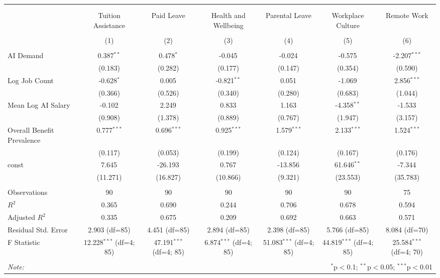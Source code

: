 \begin{table}[!htbp] \centering
\begin{tabular}{@{\extracolsep{5pt}}lcccccc}
\\[-1.8ex]\hline
\hline \\[-1.8ex]
\\[-1.8ex] & \multicolumn{1}{c}{Tuition Assistance} & \multicolumn{1}{c}{Paid Leave} & \multicolumn{1}{c}{Health and Wellbeing} & \multicolumn{1}{c}{Parental Leave} & \multicolumn{1}{c}{Workplace Culture} & \multicolumn{1}{c}{Remote Work}  \\
\\[-1.8ex] & (1) & (2) & (3) & (4) & (5) & (6) \\
\hline \\[-1.8ex]
 AI Demand & 0.387$^{**}$ & 0.478$^{*}$ & -0.045$^{}$ & -0.024$^{}$ & -0.575$^{}$ & -2.207$^{***}$ \\
& (0.183) & (0.282) & (0.177) & (0.147) & (0.354) & (0.590) \\
 Log Job Count & -0.628$^{*}$ & 0.005$^{}$ & -0.821$^{**}$ & 0.051$^{}$ & -1.069$^{}$ & 2.856$^{***}$ \\
& (0.366) & (0.526) & (0.340) & (0.280) & (0.683) & (1.044) \\
 Mean Log AI Salary & -0.102$^{}$ & 2.249$^{}$ & 0.833$^{}$ & 1.163$^{}$ & -4.358$^{**}$ & -1.533$^{}$ \\
& (0.908) & (1.378) & (0.889) & (0.767) & (1.947) & (3.157) \\
 Overall Benefit Prevalence & 0.777$^{***}$ & 0.696$^{***}$ & 0.925$^{***}$ & 1.579$^{***}$ & 2.133$^{***}$ & 1.524$^{***}$ \\
& (0.117) & (0.053) & (0.199) & (0.124) & (0.167) & (0.176) \\
 const & 7.645$^{}$ & -26.193$^{}$ & 0.767$^{}$ & -13.856$^{}$ & 61.646$^{**}$ & -7.344$^{}$ \\
& (11.271) & (16.827) & (10.866) & (9.321) & (23.553) & (35.783) \\
\hline \\[-1.8ex]
 Observations & 90 & 90 & 90 & 90 & 90 & 75 \\
 $R^2$ & 0.365 & 0.690 & 0.244 & 0.706 & 0.678 & 0.594 \\
 Adjusted $R^2$ & 0.335 & 0.675 & 0.209 & 0.692 & 0.663 & 0.571 \\
 Residual Std. Error & 2.903 (df=85) & 4.451 (df=85) & 2.894 (df=85) & 2.398 (df=85) & 5.766 (df=85) & 8.084 (df=70) \\
 F Statistic & 12.228$^{***}$ (df=4; 85) & 47.191$^{***}$ (df=4; 85) & 6.874$^{***}$ (df=4; 85) & 51.083$^{***}$ (df=4; 85) & 44.819$^{***}$ (df=4; 85) & 25.584$^{***}$ (df=4; 70) \\
\hline
\hline \\[-1.8ex]
\textit{Note:} & \multicolumn{6}{r}{$^{*}$p$<$0.1; $^{**}$p$<$0.05; $^{***}$p$<$0.01} \\
\end{tabular}
\end{table}